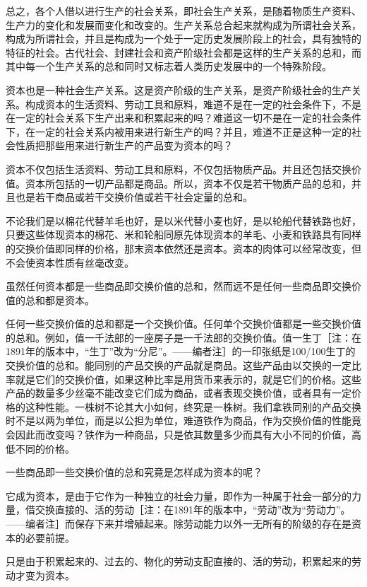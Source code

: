 \documentclass[a4paper,twoside,12pt,AutoFakeBold]{ctexart}
\begin{document}
总之，各个人借以进行生产的社会关系，即社会生产关系，是随着物质生产资料、生产力的变化和发展而变化和改变的。生产关系总合起来就构成为所谓社会关系，构成为所谓社会，并且是构成为一个处于一定历史发展阶段上的社会，具有独特的特征的社会。古代社会、封建社会和资产阶级社会都是这样的生产关系的总和，而其中每一个生产关系的总和同时又标志着人类历史发展中的一个特殊阶段。

资本也是一种社会生产关系。这是资产阶级的生产关系，是资产阶级社会的生产关系。构成资本的生活资料、劳动工具和原料，难道不是在一定的社会条件下，不是在一定的社会关系下生产出来和积累起来的吗？难道这一切不是在一定的社会条件下，在一定的社会关系内被用来进行新生产的吗？并且，难道不正是这种一定的社会性质把那些用来进行新生产的产品变为资本的吗？

资本不仅包括生活资料、劳动工具和原料，不仅包括物质产品。并且还包括交换价值。资本所包括的一切产品都是商品。所以，资本不仅是若干物质产品的总和，并且也是若干商品或若干交换价值或若干社会定量的总和。

不论我们是以棉花代替羊毛也好，是以米代替小麦也好，是以轮船代替铁路也好，只要这些体现资本的棉花、米和轮船同原先体现资本的羊毛、小麦和铁路具有同样的交换价值即同样的价格，那末资本依然还是资本。资本的肉体可以经常改变，但不会使资本性质有丝毫改变。

虽然任何资本都是一些商品即交换价值的总和，然而远不是任何一些商品即交换价值的总和都是资本。

任何一些交换价值的总和都是一个交换价值。任何单个交换价值都是一些交换价值的总和。例如，值一千法郎的一座房子是一千法郎的交换价值。值一生丁［注：在1891年的版本中，“生丁”改为“分尼”。——编者注］的一印张纸是100/100生丁的交换价值的总和。能同别的产品交换的产品就是商品。这些产品由以交换的一定比率就是它们的交换价值，如果这种比率是用货币来表示的，就是它们的价格。这些产品的数量多少丝毫不能改变它们成为商品，或者表现交换价值，或者具有一定价格的这种性能。一株树不论其大小如何，终究是一株树。我们拿铁同别的产品交换时不是以两为单位，而是以公担为单位，难道铁作为商品，作为交换价值的性能竟会因此而改变吗？铁作为一种商品，只是依其数量多少而具有大小不同的价值，高低不同的价格。

一些商品即一些交换价值的总和究竟是怎样成为资本的呢？

它成为资本，是由于它作为一种独立的社会力量，即作为一种属于社会一部分的力量，借交换直接的、活的劳动［注：在1891年的版本中，“劳动”改为“劳动力”。——编者注］而保存下来并增殖起来。除劳动能力以外一无所有的阶级的存在是资本的必要前提。

只是由于积累起来的、过去的、物化的劳动支配直接的、活的劳动，积累起来的劳动才变为资本。
\end{document}
